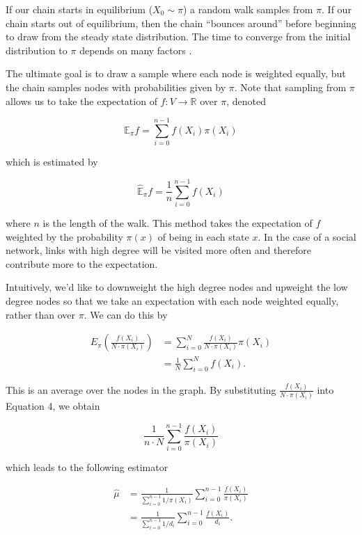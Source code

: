 \documentclass[a4paper]{article}
\begin{document}
If our chain starts in equilibrium ($X_0 \sim \pi$) a random walk samples from $\pi$. If our chain starts out of equilibrium, then the chain ``bounces around'' before beginning to draw from the steady state distribution. The time to converge from the initial distribution to $\pi$ depends on many factors \cite{}.

The ultimate goal is to draw a sample where each node is weighted equally, but the chain samples nodes with probabilities given by $\pi$. Note that sampling from $\pi$ allows us to take the expectation of $f: V \to \mathbb{R}$ over $\pi$, denoted

\begin{equation}
\mathbb{E}_\pi f = \sum_{i = 0}^{n-1} f(X_i) \pi(X_i)
\end{equation}

\noindent
which is estimated by

\begin{equation}
\hat{\mathbb{E}}_\pi f = \frac{1}{n} \sum_{i = 0}^{n-1} f(X_i)
\end{equation}

\noindent
where $n$ is the length of the walk. This method takes the expectation of $f$ weighted by the probability $\pi(x)$ of being in each state $x$. In the case of a social network, links with high degree will be visited more often and therefore contribute more to the expectation.

Intuitively, we'd like to downweight the high degree nodes and upweight the low degree nodes so that we take an expectation with each node weighted equally, rather than over $\pi$. We can do this by

\begin{align}
E_\pi (\frac{f(X_i)}{N \cdot \pi(X_i)}) &= \sum_{i=0}^{N} \frac{f(X_i)}{N \cdot \pi(X_i)} \pi(X_i)\\
&= \frac{1}{N} \sum_{i=0}^{N} f(X_i).
\end{align}

This is an average over the nodes in the graph. By substituting $\frac{f(X_i)}{N \cdot \pi(X_i)}$ into Equation 4, we obtain

\begin{equation}
\frac{1}{n \cdot N} \sum_{i=0}^{n-1} \frac{f(X_i)}{\pi(X_i)}
\end{equation}

\noindent
which leads to the following estimator

\begin{align}
\hat{\mu} &= \frac{1}{\sum_{i=0}^{n-1} 1 / \pi(X_i)} \sum_{i=0}^{n-1} \frac{f(X_i)}{\pi(X_i)} \\
&=\frac{1}{\sum_{i=0}^{n-1} 1 / d_i} \sum_{i=0}^{n-1} \frac{f(X_i)}{d_i}.
\end{align}
\end{document}
